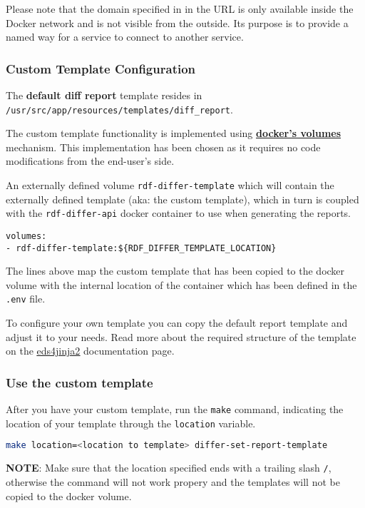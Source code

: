 	Please note that the domain specified in in the URL is only available inside the Docker network and is not visible from the outside. Its purpose is to provide a named way for a service to connect to another service. 

		\subsubsection{Custom Template Configuration}
		The \textbf{default diff report} template resides in \\ \texttt{/usr/src/app/resources/templates/diff\_report}.

		The custom template functionality is implemented using \textbf{\href{https://docs.docker.com/storage/volumes/}{docker's volumes}} mechanism. This implementation has been chosen as it requires no code modifications from the end-user's side.
		
		An externally defined volume \texttt{rdf-differ-template} which will contain the externally defined template (aka: the custom template), which in turn is coupled with the \texttt{rdf-differ-api} docker container to use when generating the reports.
		\begin{lstlisting}[]
volumes:
- rdf-differ-template:${RDF_DIFFER_TEMPLATE_LOCATION}
		\end{lstlisting}
		The lines above map the custom template that has been copied to the docker volume with the internal location of the container which has been defined in the \texttt{.env} file.
		
		To configure your own template you can copy the default report template and adjust it to your needs. Read more about the required structure of the template on the \href{https://eds4jinja2.readthedocs.io/en/latest/#target-directory-layout}{\underline{eds4jinja2}} documentation page.
		 
		\subsubsection{Use the custom template}
		After you have your custom template, run the \texttt{make} command, indicating the location of your template through the \texttt{location} variable.
		\begin{lstlisting}[language=bash]
make location=<location to template> differ-set-report-template
		\end{lstlisting}

		\textbf{NOTE}: Make sure that the location specified ends with a trailing slash \texttt{/}, otherwise the command will not work propery and the templates will not be copied to the docker volume.

